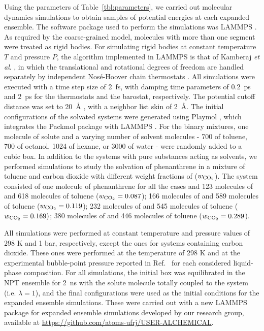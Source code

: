 \documentclass[final,12p,times,twocolumn]{elsarticle}
\begin{document}
	Using the parameters of Table~\ref{tbl:parameters}, we carried out molecular dynamics simulations to obtain samples of potential energies at each expanded ensemble. The software package used to perform the simulations was LAMMPS \cite{lammps}. As required by the coarse-grained model, molecules with more than one segment were treated as rigid bodies. For simulating rigid bodies at constant temperature $T$ and pressure $P$, the algorithm implemented in LAMMPS is that of Kamberaj \textit{et al}. \cite{kamberaj}, in which the translational and rotational degrees of freedom are handled separately by independent Nos\'{e}-Hoover chain thermostats \cite{PhysRevA.31.1695}. All simulations were executed with a time step size of 2~fs, with damping time parameters of 0.2~ps and 2~ps for the thermostats and the barostat, respectively. The potential cutoff distance was set to 20~$\text{\AA}$ \cite{muller2017}, with a neighbor list skin of 2~$\text{\AA}$. The initial configurations of the solvated systems were generated using Playmol \cite{playmol}, which integrates the Packmol package \cite{packmol} with LAMMPS \cite{lammps}. For the binary mixtures, one molecule of solute and a varying number of solvent molecules - 700 of toluene, 700 of octanol, 1024 of hexane, or 3000 of water - were randomly added to a cubic box. In addition to the systems with pure substances acting as solvents, we performed simulations to study the solvation of phenanthrene in a mixture of toluene and carbon dioxide with different weight fractions of  ($w_\text{\ce{CO_2}}$). The system consisted of one molecule of phenanthrene for all the cases and 123 molecules of  and 618 molecules of toluene ($w_\text{\ce{CO_2}} = 0.087$); 166 molecules of  and 589 molecules of toluene ($w_\text{\ce{CO_2}} = 0.119$); 232 molecules of  and 545 molecules of toluene ($w_\text{\ce{CO_2}} = 0.169)$; 380 molecules of  and 446 molecules of toluene ($w_\text{\ce{CO_2}} = 0.289$).

	All simulations were performed at constant temperature and pressure values of 298 K and 1 bar, respectively, except the ones for systems containing carbon dioxide. These ones were performed at the temperature of 298 K and at the experimental bubble-point pressure reported in Ref.~\cite{co2toliq} for each considered liquid-phase composition. For all simulations, the initial box was equilibrated in the NPT ensemble for 2~ns with the solute molecule totally coupled to the system (i.e. $\lambda = 1$), and the final configurations were used as the initial conditions for the expanded ensemble simulations. These were carried out with a new LAMMPS package for expanded ensemble simulations developed by our research group, available at \url{https://github.com/atoms-ufrj/USER-ALCHEMICAL}.
\end{document}
